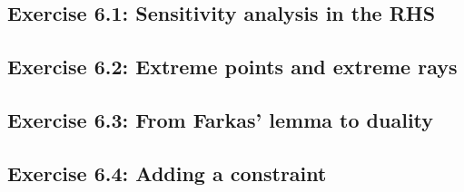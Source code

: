 \subsection*{Exercise 6.1: Sensitivity analysis in the RHS}


\subsection*{Exercise 6.2: Extreme points and extreme rays}


\subsection*{Exercise 6.3: From Farkas' lemma to duality}


\subsection*{Exercise 6.4: Adding a constraint}







